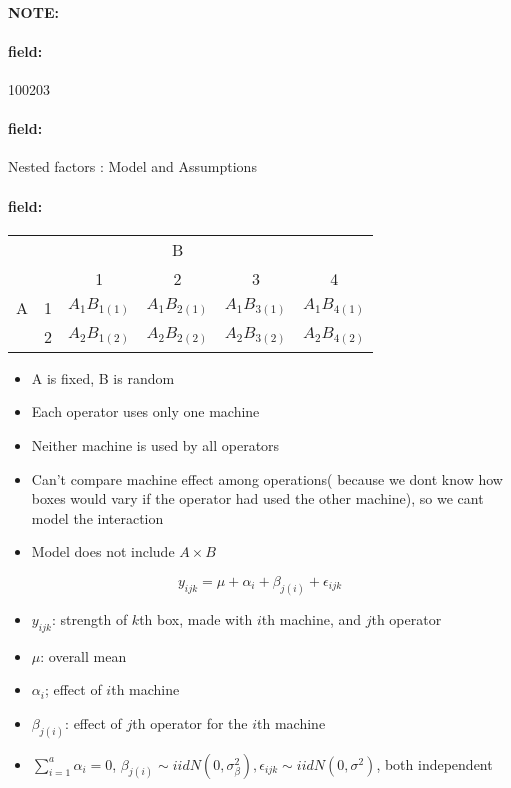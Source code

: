 \documentclass[12pt]{article}
\newenvironment{note}{\paragraph{NOTE:}}{}
\newenvironment{field}{\paragraph{field:}}{}
\begin{document}
\begin{note}
    \begin{field}
        \tiny 100203
    \end{field}
    \begin{field}
      Nested factors : Model and Assumptions
    \end{field}
    \begin{field}
      \begin{tabular}{c c c c c c}
        & & & B & & \\
        & &  1 & 2 & 3 & 4 \\
        A & 1 & $A_1B_{1(1)}$ & $A_1 B_{2(1)}$ & $A_1B_{3(1)}$ & $A_1B_{4(1)}$\\
        & 2 & $A_2B_{1(2)}$ & $A_2B_{2(2)}$ & $A_2B_{3(2)}$ & $A_2B_{4(2)}$
      \end{tabular}
       \begin{itemize}
         \item A is fixed, B is random
         \item Each operator uses only one machine
         \item Neither machine is used by all operators
         \item Can't compare machine effect among operations( because we dont know how boxes would vary if the operator had used the other machine), so we cant model the interaction
         \item Model does not include $ A \times B$
       \end{itemize}
       $$ y_{ijk} = \mu + \alpha_i + \beta_{j(i)} + \epsilon_{ijk} $$
      \begin{itemize}
        \item $y_{ijk}$: strength of $k$th box, made with $i$th machine, and $j$th operator
        \item $\mu$: overall mean
        \item $\alpha_i$; effect of $i$th machine
        \item $\beta_{j(i)}$: effect of $j$th operator for the $i$th machine
        \item $\sum_{i=1}^a \alpha_i = 0$, $\beta_{j(i)} \sim iid N(0,\sigma_\beta^2), \epsilon_{ijk} \sim iid N(0,\sigma^2)$, both independent
      \end{itemize}
    \end{field}
\end{note}
\end{document}
